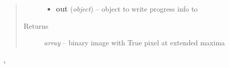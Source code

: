 \documentclass[letterpaper,10pt,english]{sphinxmanual}
\begin{document}
\begin{fulllineitems}
\begin{quote}
\begin{description}
\begin{itemize}
\item {} 
\textbf{out} (\emph{object}) --
object to write progress info to

\end{itemize}

\item[{Returns}] \leavevmode
\emph{array} --
binary image with True pixel at extended maxima

\end{description}\end{quote}




{\hyperref[api/ClearMap.ImageProcessing:ClearMap.ImageProcessing.MaximaDetection.hMaxTransform]{\emph{}}}, {\hyperref[api/ClearMap.ImageProcessing:ClearMap.ImageProcessing.MaximaDetection.localMax]{\emph{}}}



\end{fulllineitems}

\end{document}
